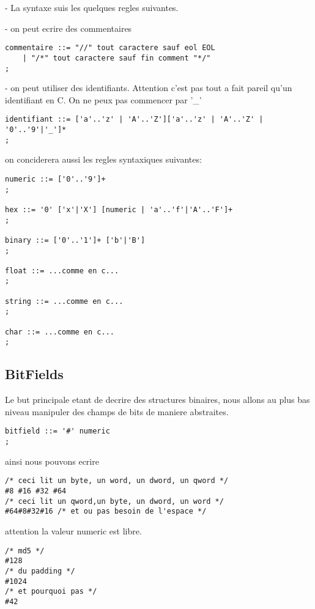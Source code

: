 \documentclass[11pt]{report}
\begin{document}
- La syntaxe suis les quelques regles suivantes.

- on peut ecrire des commentaires
\begin{lstlisting}
commentaire ::= "//" tout caractere sauf eol EOL
	| "/*" tout caractere sauf fin comment "*/"
;
\end{lstlisting}

- on peut utiliser des identifiants.
Attention c'est pas tout a fait pareil qu'un identifiant en C.
On ne peux pas commencer par '\_'
\begin{lstlisting}
identifiant ::= ['a'..'z' | 'A'..'Z']['a'..'z' | 'A'..'Z' | '0'..'9'|'_']*
;
\end{lstlisting}

on conciderera aussi les regles syntaxiques suivantes:
\begin{lstlisting}
numeric ::= ['0'..'9']+
;

hex ::= '0' ['x'|'X'] [numeric | 'a'..'f'|'A'..'F']+
;

binary ::= ['0'..'1']+ ['b'|'B']
;

float ::= ...comme en c...
;

string ::= ...comme en c...
;

char ::= ...comme en c...
;
\end{lstlisting}

\subsection{BitFields}
Le but principale etant de decrire des structures binaires, nous allons au plus bas
niveau manipuler des champs de bits de maniere abstraites.

\begin{lstlisting}
bitfield ::= '#' numeric
;
\end{lstlisting}

ainsi nous pouvons ecrire

\begin{lstlisting}
/* ceci lit un byte, un word, un dword, un qword */
#8 #16 #32 #64
/* ceci lit un qword,un byte, un dword, un word */
#64#8#32#16 /* et ou pas besoin de l'espace */
\end{lstlisting}

attention la valeur numeric est libre.

\begin{lstlisting}
/* md5 */
#128
/* du padding */
#1024
/* et pourquoi pas */
#42
\end{lstlisting}
\end{document}
